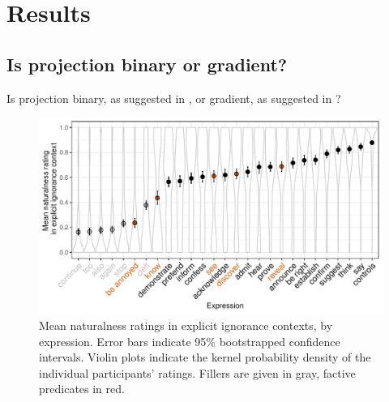 \documentclass[11pt,fleqn]{article}
\newcommand{\6}{\mbox{$[\hspace*{-.6mm}[$}}
\newcommand{\9}{\mbox{$]\hspace*{-.6mm}]$}}
\begin{document}
\newpage

\section{Results}

\subsection{Is projection binary or gradient?}

Is projection binary, as suggested in \citealt{mandelkern-etal2020}, or gradient, as suggested in \citealt{degen-tonhauser-openmind,degen-tonhauser-language}?

\begin{figure}[h!]
\centering
\includegraphics[width=\textwidth]{../../results/main/13explicitIgnorance/graphs/explicit-ignorance-naturalness-by-predicate}
\caption{Mean naturalness ratings in explicit ignorance contexts, by expression. Error bars indicate 95\% bootstrapped confidence intervals. Violin plots indicate the kernel probability density of the individual participants' ratings. Fillers are given in gray, factive predicates in red.}\label{fig:}
\end{figure}
\end{document}
